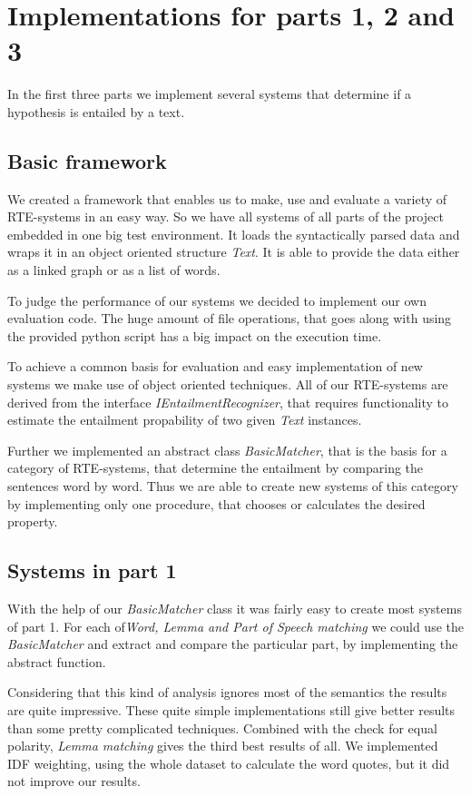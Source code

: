 
\section{Implementations for parts 1, 2 and 3}

In the first three parts we implement several systems that determine if 
a hypothesis is entailed by a text.


\subsection{Basic framework}

We created a framework that enables us to make, use and evaluate
a variety of RTE-systems in an easy way. So we have all systems of all parts
of the project embedded in one big test environment.
It loads the syntactically parsed data and wraps it in an object oriented structure 
\textit{Text}. It is able to provide the data either as a linked graph or as a 
list of words.

To judge the performance of our systems we decided to implement our own evaluation
code. The huge amount of file operations, that goes along with using the provided 
python script has a big impact on the execution time.

To achieve a common basis for evaluation and easy implementation of new systems we make use of 
object oriented techniques. All of our RTE-systems are derived from the interface
\textit{IEntailmentRecognizer}, that requires functionality to estimate the entailment
propability of two given \textit{Text} instances.

Further we implemented an abstract class \textit{BasicMatcher}, that is the basis for a
category of RTE-systems, that determine the entailment by comparing the sentences word by word.
Thus we are able to create new systems of this category by implementing only one procedure, 
that chooses or calculates the desired property.

\subsection{Systems in part 1}

With the help of our \textit{BasicMatcher} class it was fairly easy to create most systems
of part 1. For each of\textit{Word, Lemma and Part of Speech matching} we could use the 
\textit{BasicMatcher} and extract and compare the particular part, by implementing the
abstract function.

Considering that this kind of analysis ignores most of the semantics the results are quite
impressive. These quite simple implementations still give better results than some 
pretty complicated techniques. Combined with the check for equal polarity, 
\textit{Lemma matching} gives the third best results of all. We implemented IDF weighting,
using the whole dataset to calculate the word quotes, but it did not improve our results.

